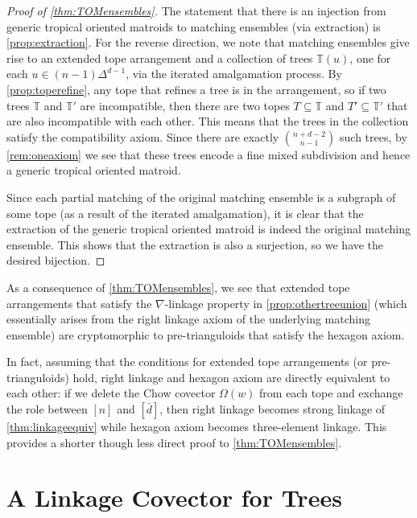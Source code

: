 \documentclass[letterpaper,reqno,11pt]{amsart}
\begin{document}
\begin{proof}[Proof of \cref{thm:TOMensembles}]
    The statement that there is an injection from generic tropical oriented matroids to matching ensembles (via extraction) is \cref{prop:extraction}. For the reverse direction, we note that matching ensembles give rise to an extended tope arrangement and a collection of trees $\mathbb{T}(u)$, one for each $u\in (n-1)\Delta^{d-1}$, via the iterated amalgamation process. By \cref{prop:toperefine}, any tope that refines a tree is in the arrangement, so if two trees $\mathbb{T}$ and $\mathbb{T}'$ are incompatible, then there are two topes $T\subseteq \mathbb{T}$ and $T'\subseteq \mathbb{T}'$ that are also incompatible with each other. This means that the trees in the collection satisfy the compatibility axiom. Since there are exactly $\binom{n+d-2}{n-1}$ such trees, by \cref{rem:oneaxiom} we see that these trees encode a fine mixed subdivision and hence a generic tropical oriented matroid. 
    
    Since each partial matching of the original matching ensemble is a subgraph of some tope (as a result of the iterated amalgamation), it is clear that the extraction of the generic tropical oriented matroid is indeed the original matching ensemble. This shows that the extraction is also a surjection, so we have the desired bijection.
\end{proof}

\begin{remark}
    As a consequence of \cref{thm:TOMensembles}, we see that extended tope arrangements that satisfy the $\nabla$-linkage property in \cref{prop:othertreeunion} (which essentially arises from the right linkage axiom of the underlying matching ensemble) are cryptomorphic to pre-trianguloids that satisfy the hexagon axiom. 

    In fact, assuming that the conditions for extended tope arrangements (or pre-trianguloids) hold, right linkage and hexagon axiom are directly equivalent to each other: if we delete the Chow covector $\Omega(w)$ from each tope and exchange the role between $[n]$ and $[\bar{d}]$, then right linkage becomes strong linkage of \cref{thm:linkageequiv} while hexagon axiom becomes three-element linkage. This provides a shorter though less direct proof to \cref{thm:TOMensembles}.
\end{remark}

\section{A Linkage Covector for Trees}\label{sec:treelinkage}
\end{document}
